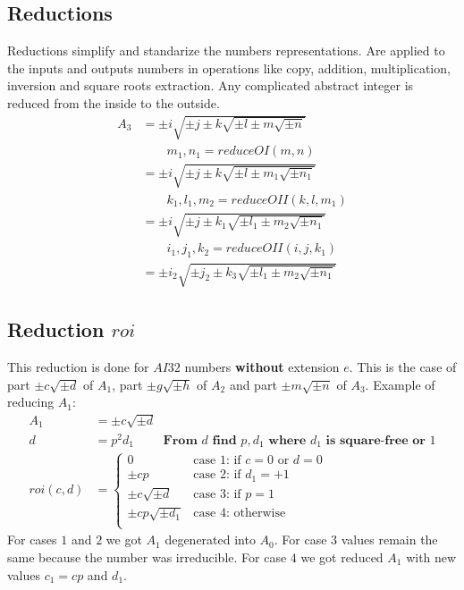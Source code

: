 \documentclass{article}
\begin{document}
\subsection{Reductions}
Reductions simplify and standarize the numbers representations. Are applied to the 
inputs and outputs numbers in operations like
copy, addition, multiplication, inversion and square roots extraction.
Any complicated abstract integer is reduced from the inside to the outside.
\begin{align}
A_3 &= \pm i\sqrt{\pm j \pm k\sqrt{\pm l \pm m\sqrt{\pm n}}}\\
 &\qquad m_1, n_1 = reduceOI(m, n) \nonumber\\
 &= \pm i\sqrt{\pm j \pm k\sqrt{\pm l \pm m_1\sqrt{\pm n_1}}}\\
 &\qquad k_1, l_1, m_2 = reduceOII(k, l, m_1) \nonumber\\
 &= \pm i\sqrt{\pm j \pm k_1\sqrt{\pm l_1 \pm m_2\sqrt{\pm n_1}}}\\
 &\qquad i_1, j_1, k_2 = reduceOII(i, j, k_1) \nonumber\\
 &= \pm i_2\sqrt{\pm j_2 \pm k_3\sqrt{\pm l_1 \pm m_2\sqrt{\pm n_1}}}
\end{align}

\subsection{Reduction $roi$}
This reduction is done for $AI32$ numbers \textbf{without} extension $e$. This is the case of
part $\pm c\sqrt{\pm d}$ of $A_1$,
part $\pm g\sqrt{\pm h}$ of $A_2$ and
part $\pm m\sqrt{\pm n}$ of $A_3$.
Example of reducing $A_1$:
\begin{align}
A_1 &= \pm c\sqrt{\pm d}\\
d   &= p^2d_1 \qquad \textbf{ From $d$ find $p,d_1$ where $d_1$ is square-free or $1$} \\
roi(c,d) &= \begin{cases}
 0                    &\text{case 1: if } c = 0 \text{ or } d = 0\\
 \pm cp               &\text{case 2: if } d_1 = +1\\
 \pm c\sqrt{\pm d}    &\text{case 3: if } p = 1\\
 \pm cp\sqrt{\pm d_1} &\text{case 4: otherwise }\\
\end{cases}
\end{align}
For cases $1$ and $2$ we got $A_1$ degenerated into $A_0$.
For case $3$ values remain the same because the number was irreducible.
For case $4$ we got reduced $A_1$ with new values $c_1=cp$ and $d_1$.
\end{document}

